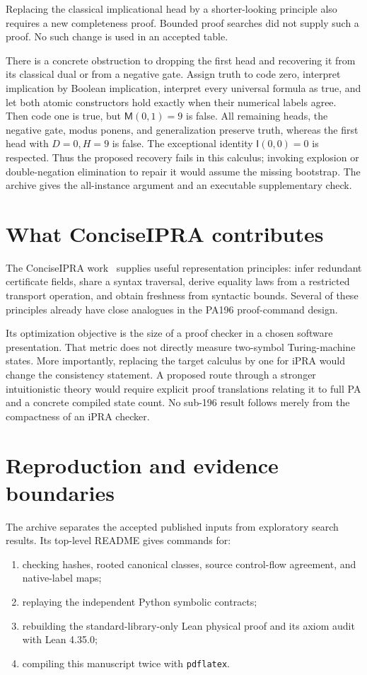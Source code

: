 \documentclass[11pt,letterpaper]{article}
\newcommand{\file}[1]{\texttt{\nolinkurl{#1}}}
\newcommand{\I}{\mathsf I}
\newcommand{\M}{\mathsf M}
\begin{document}
Replacing the classical implicational head by a shorter-looking principle
also requires a new completeness proof. Bounded proof searches did not
supply such a proof. No such change is used in an accepted table.

There is a concrete obstruction to dropping the first head and recovering
it from its classical dual or from a negative gate. Assign truth to code
zero, interpret implication by Boolean implication, interpret every
universal formula as true, and let both atomic constructors hold exactly
when their numerical labels agree. Then code one is true, but
$\M(0,1)=9$ is false. All remaining heads, the negative gate, modus
ponens, and generalization preserve truth, whereas the first head with
$D=0,H=9$ is false. The exceptional identity $\I(0,0)=0$ is respected.
Thus the proposed recovery fails in this calculus; invoking explosion
or double-negation elimination to repair it would assume the missing
bootstrap. The archive gives the all-instance argument and an executable
supplementary check.

\section{What ConciseIPRA contributes}

The ConciseIPRA work~\cite{ipra} supplies useful representation principles:
infer redundant certificate fields, share a syntax traversal, derive
equality laws from a restricted transport operation, and obtain freshness
from syntactic bounds. Several of these principles already have close
analogues in the PA196 proof-command design.

Its optimization objective is the size of a proof checker in a chosen
software presentation. That metric does not directly measure two-symbol
Turing-machine states. More importantly, replacing the target calculus by
one for iPRA would change the consistency statement. A proposed route
through a stronger intuitionistic theory would require explicit proof
translations relating it to full PA and a concrete compiled state count.
No sub-196 result follows merely from the compactness of an iPRA checker.

\section{Reproduction and evidence boundaries}

The archive separates the accepted published inputs from exploratory
search results. Its top-level README gives commands for:
\begin{enumerate}
\item checking hashes, rooted canonical classes, source control-flow
  agreement, and native-label maps;
\item replaying the independent Python symbolic contracts;
\item rebuilding the standard-library-only Lean physical proof and its
  axiom audit with Lean 4.35.0;
\item compiling this manuscript twice with \file{pdflatex}.
\end{enumerate}
\end{document}
